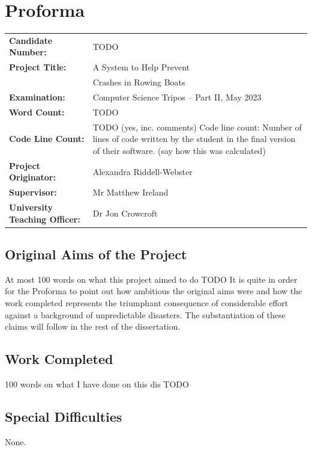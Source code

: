 \documentclass[12pt,a4paper]{report}
\begin{document}
\chapter*{Proforma}

{\large
\begin{tabular}{ll}
\bf Candidate Number:   & TODO \\
\bf Project Title:  & A System to Help Prevent \\
& Crashes in Rowing Boats \\
\bf Examination:  & Computer Science Tripos -- Part II, May 2023      \\
\bf Word Count:    & TODO \footnotemark[1]   \\
\bf Code Line Count:    & TODO (yes, inc. comments) Code line count: Number of lines of code written by the student in the final version of their software. (say how this was calculated)\\
\bf Project Originator: & Alexandra Riddell-Webster                 \\
\bf Supervisor:         & Mr Matthew Ireland  \\ 
\bf University Teaching Officer:  & Dr Jon Crowcroft \\ 
\end{tabular}
}


\section*{Original Aims of the Project}
At most 100 words on what this project aimed to do
TODO
It is quite in order for the Proforma to point out how ambitious the original aims were and how the work completed represents the triumphant consequence of considerable effort against a background of unpredictable disasters. The substantiation of these claims will follow in the rest of the dissertation.

\section*{Work Completed}
100 words on what I have done on this dis
TODO

\section*{Special Difficulties}
None.
\end{document}
